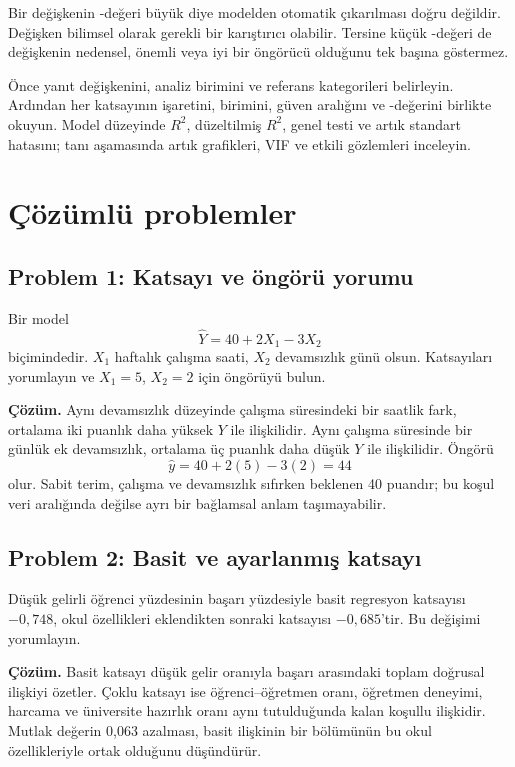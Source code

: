 \begin{mistakebox}
Bir değişkenin \pval-değeri büyük diye modelden otomatik çıkarılması doğru değildir.
Değişken bilimsel olarak gerekli bir karıştırıcı olabilir. Tersine küçük
\pval-değeri de değişkenin nedensel, önemli veya iyi bir öngörücü olduğunu tek
başına göstermez.
\end{mistakebox}

\begin{outputguidebox}
Önce yanıt değişkenini, analiz birimini ve referans kategorileri belirleyin.
Ardından her katsayının işaretini, birimini, güven aralığını ve \pval-değerini
birlikte okuyun. Model düzeyinde $R^2$, düzeltilmiş $R^2$, genel \Fstat testi ve
artık standart hatasını; tanı aşamasında artık grafikleri, VIF ve etkili
gözlemleri inceleyin.
\end{outputguidebox}

\section{Çözümlü problemler}

\subsection*{Problem 1: Katsayı ve öngörü yorumu}

Bir model
\[
\hat Y=40+2X_1-3X_2
\]
biçimindedir. $X_1$ haftalık çalışma saati, $X_2$ devamsızlık günü olsun.
Katsayıları yorumlayın ve $X_1=5$, $X_2=2$ için öngörüyü bulun.

\textbf{Çözüm.} Aynı devamsızlık düzeyinde çalışma süresindeki bir saatlik
fark, ortalama iki puanlık daha yüksek $Y$ ile ilişkilidir. Aynı çalışma
süresinde bir günlük ek devamsızlık, ortalama üç puanlık daha düşük $Y$ ile
ilişkilidir. Öngörü
\[
\hat y=40+2(5)-3(2)=44
\]
olur. Sabit terim, çalışma ve devamsızlık sıfırken beklenen 40 puandır; bu
koşul veri aralığında değilse ayrı bir bağlamsal anlam taşımayabilir.

\subsection*{Problem 2: Basit ve ayarlanmış katsayı}

Düşük gelirli öğrenci yüzdesinin başarı yüzdesiyle basit regresyon katsayısı
$-0{,}748$, okul özellikleri eklendikten sonraki katsayısı $-0{,}685$'tir.
Bu değişimi yorumlayın.

\textbf{Çözüm.} Basit katsayı düşük gelir oranıyla başarı arasındaki toplam
doğrusal ilişkiyi özetler. Çoklu katsayı ise öğrenci--öğretmen oranı, öğretmen
deneyimi, harcama ve üniversite hazırlık oranı aynı tutulduğunda kalan koşullu
ilişkidir. Mutlak değerin 0,063 azalması, basit ilişkinin bir bölümünün bu okul
özellikleriyle ortak olduğunu düşündürür.


